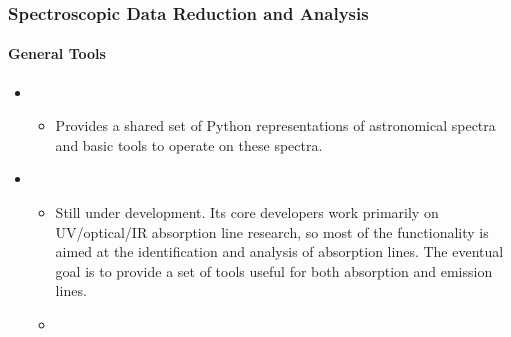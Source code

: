 \documentclass[letterpaper,10pt,english]{sphinxmanual}
\begin{document}
\subsubsection{Spectroscopic Data Reduction and Analysis}
\label{\detokenize{resource/astro/topics/spectroscopy:spectroscopic-data-reduction-and-analysis}}\label{\detokenize{resource/astro/topics/spectroscopy::doc}}

\paragraph{General Tools}
\label{\detokenize{resource/astro/topics/spectroscopy:general-tools}}\begin{itemize}
\item {} 
\begin{itemize}
\item {} 
Provides a shared set of Python representations of astronomical
spectra and basic tools to operate on these spectra.

\end{itemize}

\item {} 
\begin{itemize}
\item {} 
Still under development. Its core developers work primarily on
UV/optical/IR absorption line research, so most of the
functionality is aimed at the identification and analysis of
absorption lines. The eventual goal is to provide a set of tools
useful for both absorption and emission lines.

\item {} 

\end{itemize}

\end{itemize}
\end{document}
